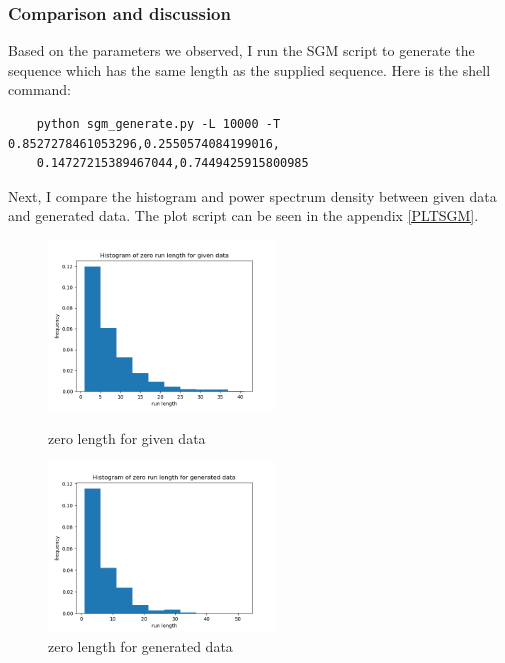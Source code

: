 \documentclass[11pt]{article}
\begin{document}
\subsubsection{Comparison and discussion}
Based on the parameters we observed, I run the SGM script to generate the sequence which has the same length as the supplied sequence.
Here is the shell command:
\begin{verbatim}
    python sgm_generate.py -L 10000 -T 0.8527278461053296,0.2550574084199016,
    0.14727215389467044,0.7449425915800985
\end{verbatim}
Next, I compare the histogram and power spectrum density between given data and generated data. The plot script can be seen in the appendix \ref{PLTSGM}.
\newpage
\begin{figure}[htbp]
    \centering
    \begin{minipage}[t]{0.48\textwidth}
    \centering
    \includegraphics[width=6cm]{Histogram_of_zero_run_length_for_given_data.png}
    \caption{zero length for given data}
    \end{minipage}
    \begin{minipage}[t]{0.48\textwidth}
    \centering
    \includegraphics[width=6cm]{Histogram_of_zero_run_length_for_generated_data.png}
    \caption{zero length for generated data}
    \end{minipage}
\end{figure}
\end{document}
